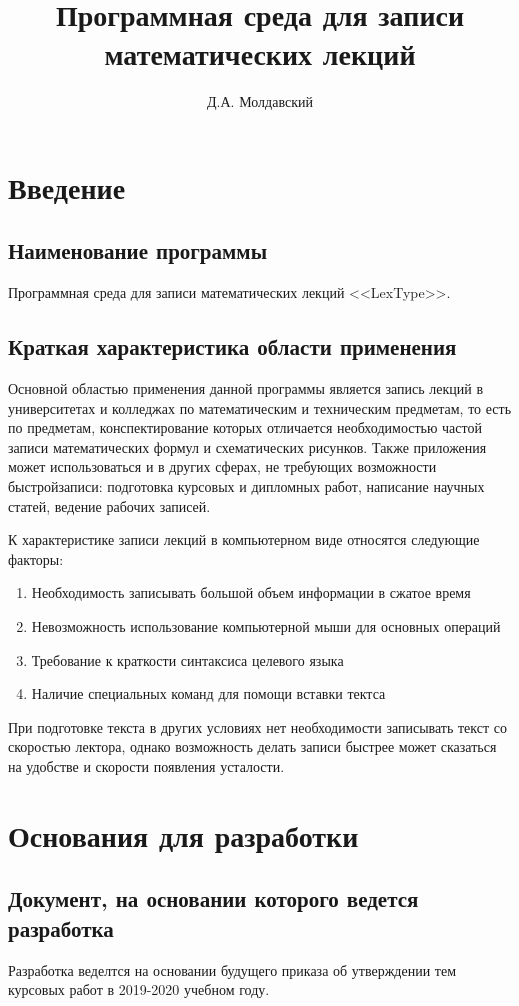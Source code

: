\documentclass[techtask]{espd}
\author{Д.А. Молдавский}
\title{Программная среда для записи\\математических лекций}
\begin{document}
\annotation

\tableofcontents

\section{Введение}
\subsection{Наименование программы}
Программная среда для записи математических лекций <<LexType>>.

\subsection{Краткая характеристика области применения}
Основной областью применения данной программы является запись лекций в университетах и колледжах по математическим и техническим предметам, то есть по предметам, конспектирование которых отличается необходимостью частой записи математических формул и схематических рисунков. Также приложения может использоваться и в других сферах, не требующих возможности быстройзаписи: подготовка курсовых и дипломных работ, написание научных статей, ведение рабочих записей.

К характеристике записи лекций в компьютерном виде относятся следующие факторы:

\begin{enumerate}
\item Необходимость записывать большой объем информации в сжатое время
\item Невозможность использование компьютерной мыши для основных операций
\item Требование к краткости синтаксиса целевого языка
\item Наличие специальных команд для помощи вставки тектса
\end{enumerate}

При подготовке текста в других условиях нет необходимости записывать текст со скоростью лектора, однако возможность делать записи быстрее может сказаться на удобстве и скорости появления усталости.

\section{Основания для разработки}
\subsection{Документ, на основании которого ведется разработка}
Разработка веделтся на основании будущего приказа об утверждении тем курсовых работ в 2019-2020 учебном году.
\end{document}
